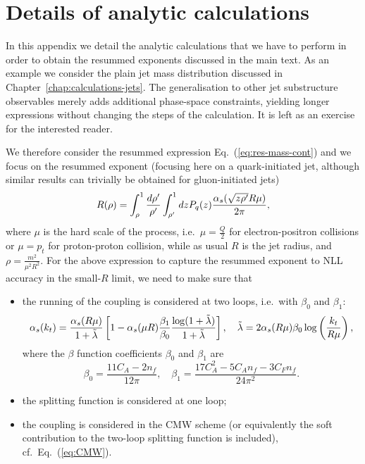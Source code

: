 \chapter{Details of analytic calculations}\label{chap:app-analytic-details}

In this appendix we detail the analytic calculations that we have to
perform in order to obtain the resummed exponents discussed in the
main text. As an example we consider the plain jet mass distribution
discussed in Chapter~\ref{chap:calculations-jets}. The generalisation
to other jet substructure observables merely adds additional
phase-space constraints, yielding longer expressions without changing
the steps of the calculation. It is left as an exercise for the
interested reader.

We therefore consider the resummed expression
Eq.~(\ref{eq:res-mass-cont}) and we focus on the resummed exponent
(focusing here on a quark-initiated jet, although similar results can
trivially be obtained for gluon-initiated jets)
\begin{align}\label{app:analytic-start}
R(\rho)=\int_\rho^1 \frac{d \rho'}{\rho'} \int_{\rho'}^1 dz  P_{q}(z)
  \frac{\alpha_s( \sqrt{z \rho'} R \mu)}{2 \pi} ,
\end{align}
where $\mu$ is the hard scale of the process, i.e.\ $\mu=\frac{Q}{2}$
for electron-positron collisions or $\mu=p_t$ for proton-proton
collision, while as usual $R$ is the jet radius, and
$\rho=\tfrac{m^2}{\mu^2R^2}$. For the above expression to capture the
resummed exponent to NLL accuracy in the small-$R$ limit, we need to
make sure that 
\begin{itemize}
\item the running of the coupling is considered at two loops, i.e.\ with $\beta_0$ and $\beta_1$:
\begin{align}\label{app:running-coupling}
\alpha_s(k_t)=\frac{\alpha_s(R\mu)}{1+\tilde{\lambda}}\left[ 1- \alpha_s(\mu R)
  \frac{\beta_1}{\beta_0} \frac{\log(1+\tilde{\lambda})}{1+\tilde{\lambda}}\right],
  \quad \tilde{\lambda}=2\alpha_s(R\mu) \beta_0 \log\left(\frac{k_t}{R\mu}\right),
\end{align}
where the $\beta$ function coefficients
$\beta_0$ and $\beta_1$ are 
\begin{equation}
\beta_0 = \frac{11 C_A - 2 n_f }{12 \pi}, \quad \beta_1 = \frac{17 C_A^2 - 5 C_A n_f -3 C_F n_f}{24 \pi^2}.
\end{equation}
\item the splitting function is considered at one loop;
\item the coupling is considered in the CMW scheme (or equivalently
  the soft contribution to the two-loop splitting function is
  included), cf.~Eq.~(\ref{eq:CMW}).
\end{itemize}


